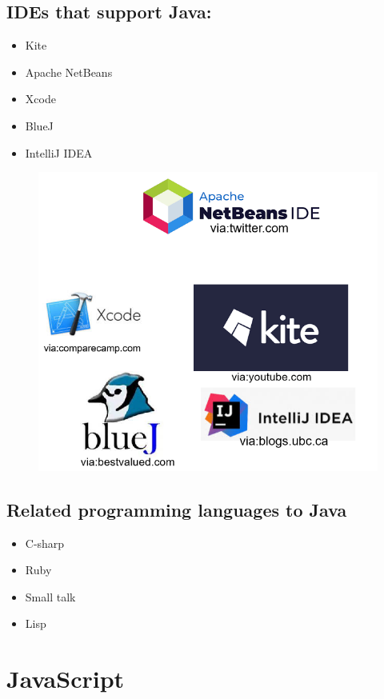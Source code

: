 \documentclass[12pt]{article}
\begin{document}
\newpage

\subsection{IDEs that support Java:}
           \begin{itemize}
           	\item Kite
           	\item Apache NetBeans
           	\item Xcode
           	\item BlueJ
           	\item IntelliJ IDEA
           \end{itemize}

\begin{figure}[h]
	\includegraphics[width=0.7\linewidth]{screenshot011}
	\caption{}
	\label{fig:screenshot011}
\end{figure}

\newpage

\subsection{Related programming languages to Java}
           \begin{itemize}
           	\item C-sharp
           	\item Ruby
           	\item Small talk
           	\item Lisp
           \end{itemize}


\newpage

\section{JavaScript}
\end{document}
